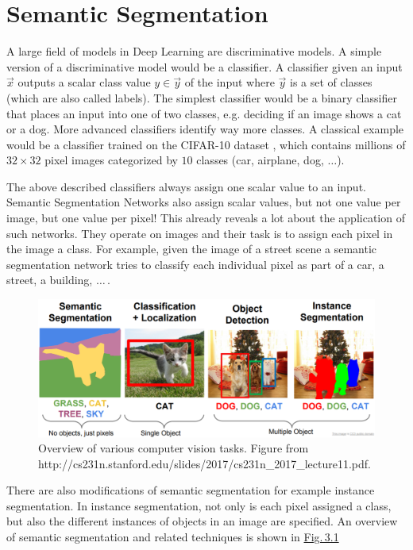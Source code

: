 
\section{Semantic Segmentation} \label{sec:3.1}
A large field of models in Deep Learning are discriminative models. A simple version of a discriminative model would be a classifier. A classifier given an input $\vec{x}$ outputs a scalar class value $y\in\vec{y}$ of the input where $\vec{y}$ is a set of classes (which are also called labels). The simplest classifier would be a binary classifier that places an input into one of two classes, e.g. deciding if an image shows a cat or a dog. More advanced classifiers identify way more classes. A classical example would be a classifier trained on the CIFAR-10 dataset \cite{cifar10}, which contains millions of $32\times32$ pixel images categorized by $10$ classes (car, airplane, dog, $\dots$).

The above described classifiers always assign one scalar value to an input. Semantic Segmentation Networks also assign scalar values, but not one value per image, but one value per pixel! This already reveals a lot about the application of such networks. They operate on images and their task is to assign each pixel in the image a class. For example, given the image of a street scene a semantic segmentation network tries to classify each individual pixel as part of a car, a street, a building, $\dots$\,.
%
\begin{figure} \label{fig:3.1}
    \centering
    \includegraphics[width=.8\textwidth]{Chapters/figures/sem_seg.PNG}
    \caption[Overview of various computer vision tasks]{Overview of various computer vision tasks. Figure from\\ http://cs231n.stanford.edu/slides/2017/cs231n\_2017\_lecture11.pdf.}
\end{figure}
%

There are also modifications of semantic segmentation for example instance segmentation. In instance segmentation, not only is each pixel assigned a class, but also the different instances of objects in an image are specified. An overview of semantic segmentation and related techniques is shown in \hyperref[fig:3.1]{Fig.\,3.1}

